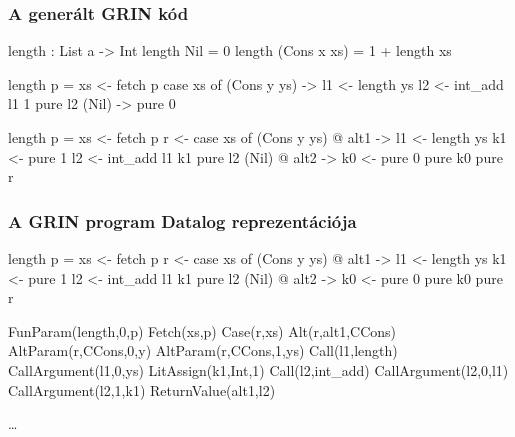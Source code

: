 \documentclass[bigger]{beamer}
\begin{document}
\begin{frame}[fragile]
\frametitle{A generált GRIN kód}

  \begin{center}
  	\begin{minipage}{0.40\textwidth}
  		\begin{haskellcode}
		length : List a -> Int
		length Nil = 0
		length (Cons x xs) 
		  = 1 + length xs
  		\end{haskellcode}
  	\end{minipage}
  	\hfill
  	\pause
  	\begin{minipage}{0.50\textwidth}
  		\begin{overprint}
 		\begin{haskellcode}
		length p =
		  xs <- fetch p
		  case xs of
		    (Cons y ys) ->
		      l1 <- length ys
		      l2 <- int_add l1 1
		      pure l2
		    (Nil) ->
		      pure 0
  		\end{haskellcode}
  		\begin{haskellcode}
		length p =
		  xs <- fetch p
		  r <- case xs of
		    (Cons y ys) @ alt1 ->
		      l1 <- length ys
		      k1 <- pure 1
		      l2 <- int_add l1 k1
		      pure l2
		    (Nil) @ alt2 ->
		      k0 <- pure 0
		      pure k0
		  pure r
  		\end{haskellcode}
  	\end{overprint}
  	\end{minipage}
  \end{center}

\end{frame}

\begin{frame}[fragile]
\frametitle{A GRIN program Datalog reprezentációja}
\begin{center}
	\begin{minipage}{0.50\textwidth}
		\begin{haskellcode}
		length p =
		  xs <- fetch p
		  r <- case xs of
		    (Cons y ys) @ alt1 ->
		      l1 <- length ys
		      k1 <- pure 1
		      l2 <- int_add l1 k1
		      pure l2
		    (Nil) @ alt2 ->
		      k0 <- pure 0
		      pure k0
		  pure r
		\end{haskellcode}
	\end{minipage}
	\hfill 
	\pause
	\begin{minipage}{0.425\textwidth}
		\vspace{0.5cm}
		\begin{haskellcode}
        FunParam(length,0,p)
        Fetch(xs,p)
        Case(r,xs)
        Alt(r,alt1,CCons)
        AltParam(r,CCons,0,y)
        AltParam(r,CCons,1,ys)
        Call(l1,length)
        CallArgument(l1,0,ys)
        LitAssign(k1,Int,1)
        Call(l2,int_add)
        CallArgument(l2,0,l1)
        CallArgument(l2,1,k1)
        ReturnValue(alt1,l2)
		\end{haskellcode}
		\dots
	\end{minipage}
\end{center}
\end{frame}
\end{document}
